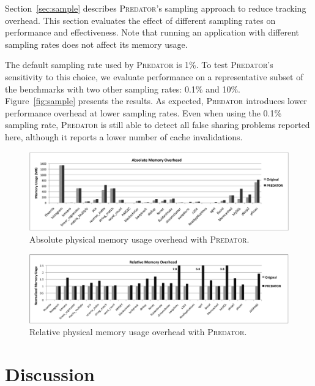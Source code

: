 \documentclass[10pt]{sigplanconf}
\newcommand{\Predator}{{\scshape Predator}}
\begin{document}
Section~\ref{sec:sample} describes \Predator{}'s sampling approach to reduce tracking overhead. This section evaluates the effect of different sampling rates on performance and effectiveness. Note that running an application with different sampling rates does not affect its memory usage.

The default sampling rate used by \Predator{} is 1\%. To test \Predator{}'s sensitivity to this choice, we evaluate performance on a representative subset of the benchmarks with two other sampling rates: 0.1\% and 10\%. Figure~\ref{fig:sample} presents the results. As expected, \Predator{} introduces lower performance overhead at lower sampling rates. Even when using the 0.1\% sampling rate, \Predator{} is still able to detect all false sharing problems reported here, although it reports a lower number of cache invalidations.

\begin{figure}[!t]
\centering
\includegraphics[width=6in]{fig/absolutememory}
\caption{Absolute physical memory usage overhead with \Predator{}.}
\label{fig:absolutememusage}
\end{figure}

\begin{figure}[!t]
\centering
\includegraphics[width=6in]{fig/memusage}
\caption{Relative physical memory usage overhead with \Predator{}.}
\label{fig:memusage}
\end{figure}

\section{Discussion}
\label{sec:discussion}
\end{document}
